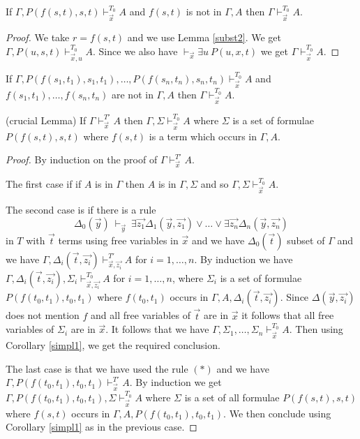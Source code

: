 \documentclass[10pt,a4paper]{article}
\begin{document}
\begin{lemma}\label{simpl}
If $\Gamma,P(f(s,t),s,t)\vdash_{\vec{x}}^{T_0} A$ and
$f(s,t)$ is not in $\Gamma,A$ then $\Gamma\vdash_{\vec{x}}^{T_0} A$.
\end{lemma}

\begin{proof}
We take $r = f(s,t)$ and we use Lemma \ref{subst2}. We get
$\Gamma,P(u,s,t)\vdash_{\vec{x},u}^{T_0} A$. Since we also have
$\vdash_{\vec{x}}\exists u~P(u,x,t)$ we get  $\Gamma\vdash_{\vec{x}}^{T_0} A$.
\end{proof}

\begin{corollary}\label{simpl1}
If $\Gamma,P(f(s_1,t_1),s_1,t_1),\dots,P(f(s_n,t_n),s_n,t_n)\vdash_{\vec{x}}^{T_0} A$ and
$f(s_1,t_1),\dots,f(s_n,t_n)$ are not in $\Gamma,A$ then $\Gamma\vdash_{\vec{x}}^{T_0} A$.
\end{corollary}


\begin{lemma} \label{crucial} (crucial Lemma) 
If $\Gamma\vdash_{\vec{x}}^{T'} A$ then $\Gamma,\Sigma\vdash_{\vec{x}}^{T_0} A$ where
$\Sigma$ is a set of formulae $P(f(s,t),s,t)$ where $f(s,t)$ is a term which
occurs in $\Gamma,A$.
\end{lemma}

\begin{proof}
By induction on the proof of $\Gamma\vdash_{\vec{x}}^{T'} A$.

\medskip

 The first case if if $A$ is in $\Gamma$ then $A$ is in $\Gamma,\Sigma$ and so 
$\Gamma,\Sigma\vdash_{\vec{x}}^{T_0} A$.

\medskip

 The second case is if there is a rule
$$
\Delta_0(\vec{y})~\vdash_{\vec{y}}~
\exists \vec{z_1}\Delta_1(\vec{y},\vec{z_1})\vee\dots\vee\exists \vec{z_n}\Delta_n(\vec{y},\vec{z_n})
$$
in $T$ with $\vec{t}$ terms using free variables in $\vec{x}$ and
we have $\Delta_0(\vec{t})$ subset of $\Gamma$ and we have
$\Gamma,\Delta_i(\vec{t},\vec{z_i})\vdash_{\vec{x},\vec{z_i}}^{T'} A$ for $i=1,\dots,n$.
By induction we have $\Gamma,\Delta_i(\vec{t},\vec{z_i}), \Sigma_i\vdash_{\vec{x},\vec{z_i}}^{T_0} A$
for $i = 1,\dots,n$, where $\Sigma_i$ is a set of formulae $P(f(t_0,t_1),t_0,t_1)$ where
$f(t_0,t_1)$ occurs in $\Gamma,A,\Delta_i(\vec{t},\vec{z_i})$.
Since $\Delta(\vec{y},\vec{z_i})$ does not mention $f$ and all free variables of $\vec{t}$ are
in $\vec{x}$ it follows that all free variables of $\Sigma_i$ are in $\vec{x}$.
It follows that we have
$\Gamma,\Sigma_1,\dots,\Sigma_n\vdash_{\vec{x}}^{T_0} A$.
Then using Corollary \ref{simpl1}, we get the required conclusion.

\medskip

 The last case is that we have used the rule $(*)$ and
we have $\Gamma,P(f(t_0,t_1),t_0,t_1)\vdash_{\vec{x}}^{T'} A$. By induction we get
$\Gamma,P(f(t_0,t_1),t_0,t_1),\Sigma \vdash_{\vec{x}}^{T_0} A$ where
$\Sigma$ is a set of all formulae $P(f(s,t),s,t)$ where $f(s,t)$ occurs
in $\Gamma,A,P(f(t_0,t_1),t_0,t_1)$. We then conclude using Corollary \ref{simpl1} as in the
previous case.
\end{proof}
\end{document}

